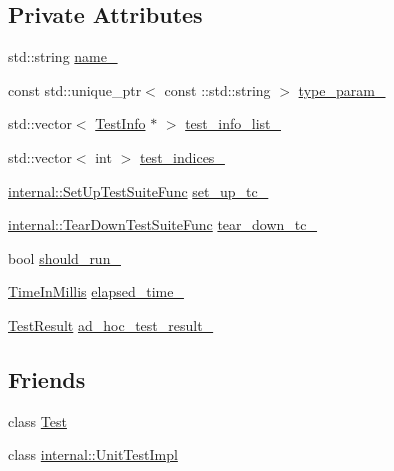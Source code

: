 \subsection*{Private Attributes}
\begin{DoxyCompactItemize}
\item 
std\+::string \mbox{\hyperlink{classtesting_1_1_test_suite_a46e3ab93d0ee8885c5348b0de145cd9b}{name\+\_\+}}
\item 
const std\+::unique\+\_\+ptr$<$ const \+::std\+::string $>$ \mbox{\hyperlink{classtesting_1_1_test_suite_a3aa1b3a0435ef55e33a36d0e241484f1}{type\+\_\+param\+\_\+}}
\item 
std\+::vector$<$ \mbox{\hyperlink{classtesting_1_1_test_info}{Test\+Info}} $\ast$ $>$ \mbox{\hyperlink{classtesting_1_1_test_suite_a3fdba9a7e08f1f8d67a1590726b73b15}{test\+\_\+info\+\_\+list\+\_\+}}
\item 
std\+::vector$<$ int $>$ \mbox{\hyperlink{classtesting_1_1_test_suite_aa85be322188dd3613fe1bcfaa7f87963}{test\+\_\+indices\+\_\+}}
\item 
\mbox{\hyperlink{namespacetesting_1_1internal_a028e9455ad22171feabf84fe46329c92}{internal\+::\+Set\+Up\+Test\+Suite\+Func}} \mbox{\hyperlink{classtesting_1_1_test_suite_a67f2469764b1e9ca0c3c6458d13876ad}{set\+\_\+up\+\_\+tc\+\_\+}}
\item 
\mbox{\hyperlink{namespacetesting_1_1internal_ab58aba5acd47d329b72a1d10c7b61648}{internal\+::\+Tear\+Down\+Test\+Suite\+Func}} \mbox{\hyperlink{classtesting_1_1_test_suite_a20c1697fd783f2b2a9069803ff991891}{tear\+\_\+down\+\_\+tc\+\_\+}}
\item 
bool \mbox{\hyperlink{classtesting_1_1_test_suite_a15749716f1d6b91d6b9e735e662c6d2c}{should\+\_\+run\+\_\+}}
\item 
\mbox{\hyperlink{namespacetesting_a992de1d091ce660f451d1e8b3ce30fd6}{Time\+In\+Millis}} \mbox{\hyperlink{classtesting_1_1_test_suite_aec25aff7c1e837c236e060736e61bea4}{elapsed\+\_\+time\+\_\+}}
\item 
\mbox{\hyperlink{classtesting_1_1_test_result}{Test\+Result}} \mbox{\hyperlink{classtesting_1_1_test_suite_ac2b1629cb484d874f4cfc12a18e04d90}{ad\+\_\+hoc\+\_\+test\+\_\+result\+\_\+}}
\end{DoxyCompactItemize}
\subsection*{Friends}
\begin{DoxyCompactItemize}
\item 
class \mbox{\hyperlink{classtesting_1_1_test_suite_ab085d1bf4cff8b1045750706b11f8662}{Test}}
\item 
class \mbox{\hyperlink{classtesting_1_1_test_suite_aa684cc13a8f91b00c0c9ce41ec7474eb}{internal\+::\+Unit\+Test\+Impl}}
\end{DoxyCompactItemize}


